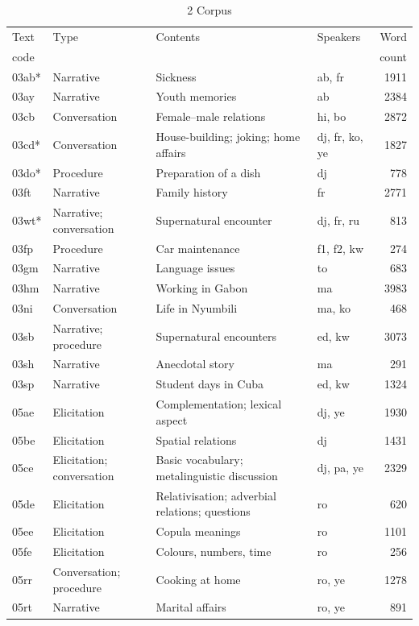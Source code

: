 \begin{longtable}{l >{\raggedright}p{2.1cm} >{\raggedright}p{4.5cm} lr}
\caption{2 Corpus}\label{tab:1:1.2}\\
\lsptoprule

Text & Type & Contents & Speakers & Word\\
code & & & & count\\
\midrule
\endhead
03ab* & Narrative & Sickness & ab, fr & 1911\\
03ay & Narrative & Youth memories & ab & 2384\\
03cb & Conversation & Female–male relations & hi, bo & 2872\\
03cd* & Conversation & House-building; joking; home affairs & dj, fr, ko, ye & 1827\\
03do* & Procedure & Preparation of a dish & dj & 778\\
03ft & Narrative & Family history & fr & 2771\\
03wt* & Narrative; conversation & Supernatural encounter & dj, fr, ru & 813\\
03fp & Procedure & Car maintenance & f1, f2, kw & 274\\
03gm & Narrative & Language issues & to & 683\\
03hm & Narrative & Working in Gabon & ma & 3983\\
03ni & Conversation & Life in Nyumbili & ma, ko & 468\\
03sb & Narrative; procedure & Supernatural encounters & ed, kw & 3073\\
03sh & Narrative & Anecdotal story & ma & 291\\
03sp & Narrative & Student days in Cuba & ed, kw & 1324\\
05ae & Elicitation & Complementation; lexical aspect & dj, ye & 1930\\
05be & Elicitation & Spatial relations & dj & 1431\\
05ce & Elicitation; conversation & Basic vocabulary; metalinguistic discussion & dj, pa, ye & 2329\\
05de & Elicitation & Relativisation; adverbial relations; questions & ro & 620\\
05ee & Elicitation & Copula meanings & ro & 1101\\
05fe & Elicitation & Colours, numbers, time & ro & 256\\
05rr & Conversation; procedure & Cooking at home & ro, ye & 1278\\
05rt & Narrative & Marital affairs & ro, ye & 891\\

\end{longtable}
